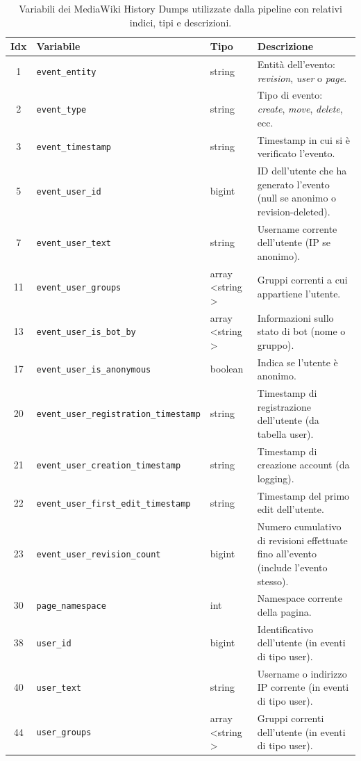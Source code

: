 \begin{table}[h]
\centering
\scriptsize
\begin{tabular}{|c|l|l|p{8cm}|}
\hline
\textbf{Idx} & \textbf{Variabile} & \textbf{Tipo} & \textbf{Descrizione} \\
\hline
1  & \texttt{event\_entity} & string & Entità dell’evento: \emph{revision}, \emph{user} o \emph{page}. \\
2  & \texttt{event\_type} & string & Tipo di evento: \emph{create}, \emph{move}, \emph{delete}, ecc. \\
3  & \texttt{event\_timestamp} & string & Timestamp in cui si è verificato l’evento. \\
5  & \texttt{event\_user\_id} & bigint & ID dell’utente che ha generato l’evento (null se anonimo o revision-deleted). \\
7  & \texttt{event\_user\_text} & string & Username corrente dell’utente (IP se anonimo). \\
11 & \texttt{event\_user\_groups} & array \textless string \textgreater & Gruppi correnti a cui appartiene l’utente. \\
13 & \texttt{event\_user\_is\_bot\_by} & array \textless string \textgreater & Informazioni sullo stato di bot (nome o gruppo). \\
17 & \texttt{event\_user\_is\_anonymous} & boolean & Indica se l’utente è anonimo. \\
20 & \texttt{event\_user\_registration\_timestamp} & string & Timestamp di registrazione dell’utente (da tabella user). \\
21 & \texttt{event\_user\_creation\_timestamp} & string & Timestamp di creazione account (da logging). \\
22 & \texttt{event\_user\_first\_edit\_timestamp} & string & Timestamp del primo edit dell’utente. \\
23 & \texttt{event\_user\_revision\_count} & bigint & Numero cumulativo di revisioni effettuate fino all’evento (include l’evento stesso). \\
30 & \texttt{page\_namespace} & int & Namespace corrente della pagina. \\
38 & \texttt{user\_id} & bigint & Identificativo dell’utente (in eventi di tipo user). \\
40 & \texttt{user\_text} & string & Username o indirizzo IP corrente (in eventi di tipo user). \\
44 & \texttt{user\_groups} & array \textless string \textgreater & Gruppi correnti dell’utente (in eventi di tipo user). \\
\hline
\end{tabular}
\caption{Variabili dei MediaWiki History Dumps utilizzate dalla pipeline con relativi indici, tipi e descrizioni.}
\label{tab:dump_variables_selected}
\end{table}


